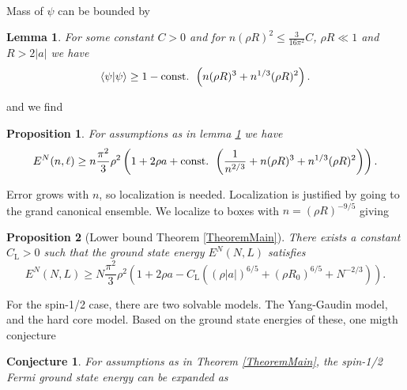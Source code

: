 \documentclass[final]{beamer}
\newcommand{\abs}[1]{\left\lvert #1 \right\rvert}
\renewcommand{\braket}[1]{\left\langle#1\right\rangle}
\newtheorem{mproposition}{Proposition}
\newtheorem{mlemma}{Lemma}
\newtheorem{mconjecture}{Conjecture}
\newlength{\colwidth}
\begin{document}
\begin{frame}[t]
\begin{columns}[t]
\begin{column}{\colwidth}
\begin{tcolorbox}[colframe=qmathblue,colback=qmathbluelyslyslys,title=Lower bound proof sketch]
\begin{equation}
\begin{aligned}
				\end{aligned}
				\end{equation}
		Mass of $ \psi $ can be bounded by 
		\begin{mlemma}\label{LemmaImprovedMassBound}
			For some constant $C>0$ and for $ n(\rho R)^2\leq  \frac{3}{16\pi^2}C $, $ \rho R\ll 1 $ and $ R>2\abs{a} $ we have
			\begin{equation}\label{EqImprovedMassBound}
			\begin{aligned}
			\braket{\psi|\psi} \geq 1-\textnormal{const. }\left(n(\rho R)^3+n^{1/3}(\rho R)^2\right).
			\end{aligned}
			\end{equation}
		\end{mlemma}
		and we find \begin{mproposition}\label{PropositionLowerBoundSpecN}
			For assumptions as in lemma \ref{LemmaImprovedMassBound} we have \begin{equation}
			E^N(n,\ell)\geq n\frac{\pi^2}{3}\rho^2\left(1+2\rho a+\textnormal{const. }\left(\frac{1}{n^{2/3}}+n(\rho R)^3+n^{1/3}(\rho R)^2\right)\right).
			\end{equation}
		\end{mproposition}
		Error grows with $n$, so localization is needed. Localization is justified by going to the grand canonical ensemble. We localize to boxes with $n=(\rho R)^{-9/5}$ giving
		\begin{mproposition}[Lower bound Theorem \ref{TheoremMain}]
			\label{PropositionLowerBound}
			There exists a constant $C_\text{L}>0$ such that the ground state energy $E^N(N,L)$ satisfies
			\begin{equation}
			\label{eqlower}
			E^N(N,L)\geq N\frac{\pi^2}{3}\rho^2\left(1+2\rho a-C_\text{L}\left((\rho\abs{a})^{6/5}+(\rho R_0)^{6/5}+N^{-2/3}\right)\right).
			\end{equation}
		\end{mproposition}
	\end{tcolorbox}
	\begin{tcolorbox}[colframe=qmathblue,colback=qmathbluelyslyslys,title=Spin-1/2 conjecture]
		For the spin-1/2 case, there are two solvable models. The Yang-Gaudin model, and the hard core model. Based on the ground state energies of these, one migth conjecture
		\begin{mconjecture}
		For assumptions as in Theorem \ref{TheoremMain}, the spin-1/2 Fermi ground state energy can be expanded as
			\begin{equation}
			\begin{aligned}

\end{aligned}
\end{equation}
\end{mconjecture}
\end{tcolorbox}
\end{column}
\end{columns}
\end{frame}
\end{document}
